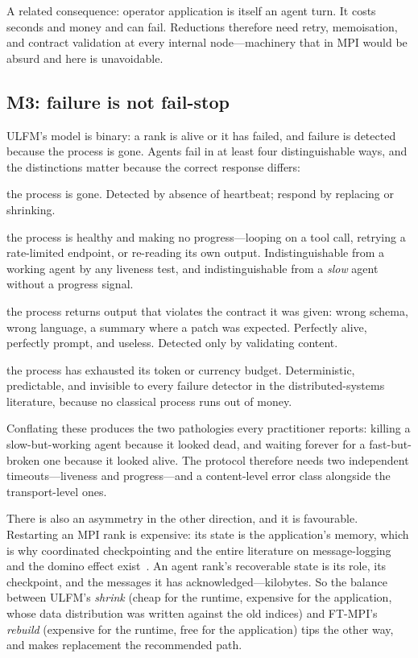 A related consequence: operator application is itself an agent turn. It
costs seconds and money and can fail. Reductions therefore need retry,
memoisation, and contract validation at every internal node---machinery that
in MPI would be absurd and here is unavoidable.

\subsection{M3: failure is not fail-stop}
\label{sec:m3}

ULFM's model is binary: a rank is alive or it has failed, and failure is
detected because the process is gone. Agents fail in at least four
distinguishable ways, and the distinctions matter because the correct
response differs:

\begin{description}[leftmargin=1.4em,style=nextline]
\item[Crashed] the process is gone. Detected by absence of heartbeat;
respond by replacing or shrinking.
\item[Stalled] the process is healthy and making no progress---looping on a
tool call, retrying a rate-limited endpoint, or re-reading its own output.
Indistinguishable from a working agent by any liveness test, and
indistinguishable from a \emph{slow} agent without a progress signal.
\item[Drifted] the process returns output that violates the contract it was
given: wrong schema, wrong language, a summary where a patch was expected.
Perfectly alive, perfectly prompt, and useless. Detected only by validating
content.
\item[Bankrupt] the process has exhausted its token or currency budget.
Deterministic, predictable, and invisible to every failure detector in the
distributed-systems literature, because no classical process runs out of
money.
\end{description}

Conflating these produces the two pathologies every practitioner reports:
killing a slow-but-working agent because it looked dead, and waiting forever
for a fast-but-broken one because it looked alive. The protocol therefore
needs two independent timeouts---liveness and progress---and a
content-level error class alongside the transport-level ones.

There is also an asymmetry in the other direction, and it is favourable.
Restarting an MPI rank is expensive: its state is the application's memory,
which is why coordinated checkpointing and the entire literature on
message-logging and the domino effect
exist~\cite{Elnozahy2002,Chandy1985}. An agent rank's recoverable state is
its role, its checkpoint, and the messages it has acknowledged---kilobytes.
So the balance between ULFM's \emph{shrink} (cheap for the runtime,
expensive for the application, whose data distribution was written against
the old indices) and FT-MPI's \emph{rebuild} (expensive for the runtime,
free for the application) tips the other way, and  makes
replacement the recommended path.

